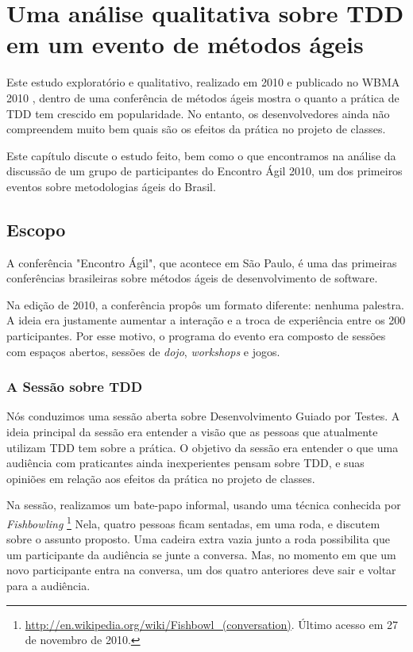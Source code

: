\chapter{Uma análise qualitativa sobre TDD em um evento de métodos ágeis}
\label{cap:motivacao}

Este estudo exploratório e qualitativo, realizado em 2010 e publicado no 
WBMA 2010 \cite{aniche-wbma}, dentro de uma conferência de 
métodos ágeis mostra o quanto a prática de TDD tem crescido em popularidade. No entanto,
os desenvolvedores ainda não compreendem muito bem quais são os efeitos
da prática no projeto de classes.

Este capítulo discute o estudo feito, bem como o que encontramos na análise
da discussão de um grupo de participantes do Encontro Ágil 2010, um
dos primeiros eventos sobre metodologias ágeis do Brasil.

\section{Escopo}

A conferência "Encontro Ágil", que acontece em São Paulo, é uma das
primeiras conferências brasileiras sobre métodos ágeis de desenvolvimento
de software. 

Na edição de 2010, a conferência propôs um formato diferente:
nenhuma palestra. A ideia era justamente aumentar a interação e a troca
de experiência entre os 200 participantes. Por esse motivo, o programa
do evento era composto de sessões com espaços abertos, sessões
de \textit{dojo}, \textit{workshops} e jogos.

\subsection{A Sessão sobre TDD}

Nós conduzimos uma sessão aberta sobre Desenvolvimento Guiado por Testes.
A ideia principal da sessão era entender a visão que as pessoas que
atualmente utilizam TDD tem sobre a prática. O objetivo da sessão
era entender o que uma audiência com praticantes ainda inexperientes
pensam sobre TDD, e suas opiniões em relação aos efeitos da prática 
no projeto de classes.

Na sessão, realizamos um bate-papo informal, usando uma técnica
conhecida por \textit{Fishbowling} 
\footnote{\url{http://en.wikipedia.org/wiki/Fishbowl_(conversation)}. Último acesso em 27 de novembro de 2010.}
Nela, quatro pessoas ficam sentadas, em uma roda, e discutem sobre
o assunto proposto. Uma cadeira extra vazia junto a roda possibilita
que um participante da audiência se junte a conversa. Mas, no momento
em que um novo participante entra na conversa, um dos quatro anteriores
deve sair e voltar para a audiência.

